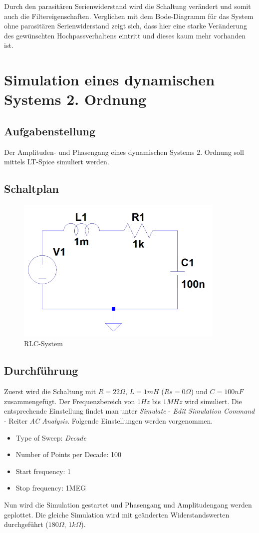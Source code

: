 \documentclass[12pt,a4paper,titlepage]{article}
\begin{document}
\noindent Durch den parasitären Serienwiderstand wird die Schaltung verändert und somit auch die Filtereigenschaften. Verglichen mit dem Bode-Diagramm für das System ohne parasitären Serienwiderstand zeigt sich, dass hier eine starke Veränderung des gewünschten Hochpassverhaltens eintritt und dieses kaum mehr vorhanden ist.


\newpage
\section{Simulation eines dynamischen Systems 2. Ordnung}
\subsection{Aufgabenstellung}
Der Amplituden- und Phasengang eines dynamischen Systems 2. Ordnung soll mittels LT-Spice simuliert werden.

\subsection{Schaltplan}
\begin{figure}[H]
  \centering
  \includegraphics[width=100mm]{filter03_schaltung.PNG}
  \caption{RLC-System}
  \label{aufgabe3_schaltplan}
\end{figure}

\subsection{Durchf\"uhrung}
Zuerst wird die Schaltung mit $R = 22 \Omega$, $L = 1 mH$ ($Rs = 0 \Omega$) und $C = 100 nF$ zusammengef\"ugt. Der Frequenzbereich von $1 Hz$ bis $1 MHz$ wird simuliert. Die entsprechende Einstellung findet man unter \textit{Simulate} - \textit{Edit Simulation Command} - Reiter \textit{AC Analysis}. Folgende Einstellungen werden vorgenommen.
\begin{itemize}
  \item Type of Sweep: \textit{Decade}
  \item Number of Points per Decade: 100
  \item Start frequency: 1
  \item Stop frequency: 1MEG
\end{itemize}
\noindent Nun wird die Simulation gestartet und Phasengang und Amplitudengang werden geplottet. Die gleiche Simulation wird mit ge\"anderten Widerstandswerten durchgef\"uhrt ($180 \Omega$, $1 k\Omega$).
\end{document}
